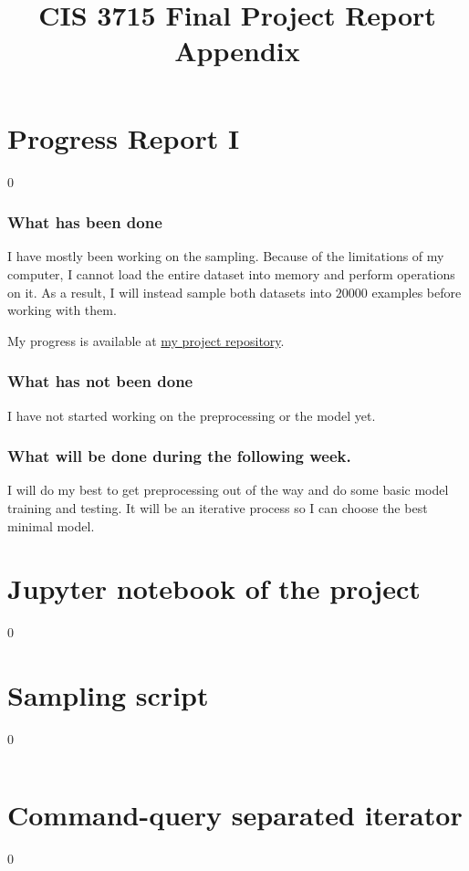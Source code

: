 \documentclass[11pt]{report}
\let\oldpart\part%
\renewcommand*\part[1]{\oldpart{#1}\setcounter{section}0}%
\begin{document}
\printbibliography

\part{Progress Report I}

\section{What has been done}

I have mostly been working on the sampling.
Because of the limitations of my computer,
I cannot load the entire dataset into memory and perform operations on it.
As a result,
I will instead sample both datasets into \(\num{20000}\) examples
before working with them.

My progress is available at \href{https://github.com/lduran2/CIS3715_DataScience_2022/tree/final/final}{my project repository}.

\section{What has not been done}

I have not started working on the preprocessing or the model yet.

\section{What will be done during the following week.}

I will do my best to get preprocessing out of the way and do some basic model training and testing.
It will be an iterative process
so I can choose the best minimal model.

\newpage
\appendix
\title{CIS 3715 Final Project Report Appendix}

\maketitle

\part{Jupyter notebook of the project}
\graphicspath{{ipynb/}}


\part{Sampling script}
\inputminted{python}{src/sample_dataset.py}

\part{Command-query separated iterator}
\inputminted{python}{src/cqs_iter.py}
\end{document}
